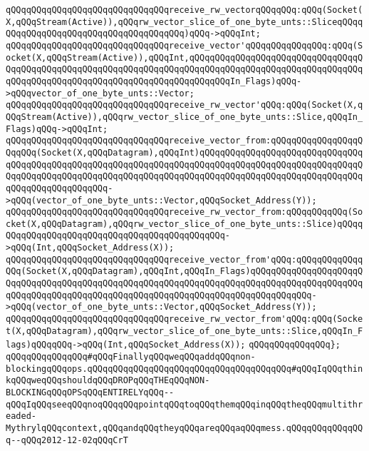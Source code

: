 \verb|qQQqqQQqqQQqqQQqqQQqqQQqqQQqqQQqreceive_rw_vectorqQQqqQQq:qQQq(Socket(X,qQQqStream(Active)),qQQqrw_vector_slice_of_one_byte_unts::SliceqQQqqQQqqQQqqQQqqQQqqQQqqQQqqQQqqQQqqQQq)qQQq->qQQqInt;|\newline
\verb|qQQqqQQqqQQqqQQqqQQqqQQqqQQqqQQqreceive_vector'qQQqqQQqqQQqqQQq:qQQq(Socket(X,qQQqStream(Active)),qQQqInt,qQQqqQQqqQQqqQQqqQQqqQQqqQQqqQQqqQQqqQQqqQQqqQQqqQQqqQQqqQQqqQQqqQQqqQQqqQQqqQQqqQQqqQQqqQQqqQQqqQQqqQQqqQQqqQQqqQQqqQQqqQQqqQQqqQQqqQQqqQQqqQQqqQQqIn_Flags)qQQq->qQQqvector_of_one_byte_unts::Vector;|\newline
\verb|qQQqqQQqqQQqqQQqqQQqqQQqqQQqqQQqreceive_rw_vector'qQQq:qQQq(Socket(X,qQQqStream(Active)),qQQqrw_vector_slice_of_one_byte_unts::Slice,qQQqIn_Flags)qQQq->qQQqInt;|\newline
\newline
\verb|qQQqqQQqqQQqqQQqqQQqqQQqqQQqqQQqreceive_vector_from:qQQqqQQqqQQqqQQqqQQqqQQq(Socket(X,qQQqDatagram),qQQqInt)qQQqqQQqqQQqqQQqqQQqqQQqqQQqqQQqqQQqqQQqqQQqqQQqqQQqqQQqqQQqqQQqqQQqqQQqqQQqqQQqqQQqqQQqqQQqqQQqqQQqqQQqqQQqqQQqqQQqqQQqqQQqqQQqqQQqqQQqqQQqqQQqqQQqqQQqqQQqqQQqqQQqqQQqqQQqqQQqqQQqqQQqqQQqqQQq->qQQq(vector_of_one_byte_unts::Vector,qQQqSocket_Address(Y));|\newline
\verb|qQQqqQQqqQQqqQQqqQQqqQQqqQQqqQQqreceive_rw_vector_from:qQQqqQQqqQQq(Socket(X,qQQqDatagram),qQQqrw_vector_slice_of_one_byte_unts::Slice)qQQqqQQqqQQqqQQqqQQqqQQqqQQqqQQqqQQqqQQqqQQqqQQq->qQQq(Int,qQQqSocket_Address(X));|\newline
\verb|qQQqqQQqqQQqqQQqqQQqqQQqqQQqqQQqreceive_vector_from'qQQq:qQQqqQQqqQQqqQQq(Socket(X,qQQqDatagram),qQQqInt,qQQqIn_Flags)qQQqqQQqqQQqqQQqqQQqqQQqqQQqqQQqqQQqqQQqqQQqqQQqqQQqqQQqqQQqqQQqqQQqqQQqqQQqqQQqqQQqqQQqqQQqqQQqqQQqqQQqqQQqqQQqqQQqqQQqqQQqqQQqqQQqqQQqqQQqqQQqqQQqqQQq->qQQq(vector_of_one_byte_unts::Vector,qQQqSocket_Address(Y));|\newline
\verb|qQQqqQQqqQQqqQQqqQQqqQQqqQQqqQQqreceive_rw_vector_from'qQQq:qQQq(Socket(X,qQQqDatagram),qQQqrw_vector_slice_of_one_byte_unts::Slice,qQQqIn_Flags)qQQqqQQq->qQQq(Int,qQQqSocket_Address(X));|\newline
\verb|qQQqqQQqqQQqqQQq};|\newline
\newline
\newline
\verb|qQQqqQQqqQQqqQQq#qQQqFinallyqQQqweqQQqaddqQQqnon-blockingqQQqops.qQQqqQQqqQQqqQQqqQQqqQQqqQQqqQQqqQQqqQQq#qQQqIqQQqthinkqQQqweqQQqshouldqQQqDROPqQQqTHEqQQqNON-BLOCKINGqQQqOPSqQQqENTIRELYqQQq--qQQqIqQQqseeqQQqnoqQQqqQQqpointqQQqtoqQQqthemqQQqinqQQqtheqQQqmultithreaded-MythrylqQQqcontext,qQQqandqQQqtheyqQQqareqQQqaqQQqmess.qQQqqQQqqQQqqQQq--qQQq2012-12-02qQQqCrT|\newline
